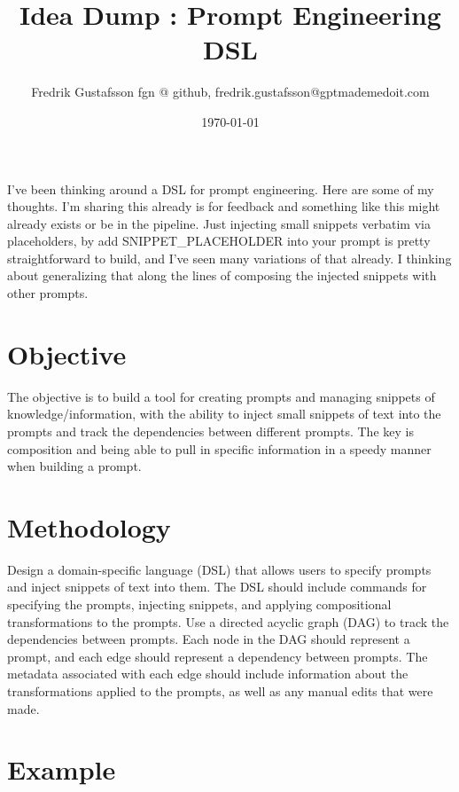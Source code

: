 \documentclass{article}
\begin{document}
\title{Idea Dump : Prompt Engineering DSL}
\author{Fredrik Gustafsson fgn @ github, fredrik.gustafsson@gptmademedoit.com}
\date{\today}

\maketitle

I've been thinking around a DSL for prompt engineering. Here are some of my thoughts. I'm sharing this already is for feedback and something like this might already exists or be in the pipeline. Just injecting small snippets verbatim via placeholders, by add SNIPPET\_PLACEHOLDER into your prompt is pretty straightforward to build, and I've seen many variations of that already. I thinking about generalizing that along the lines of composing the injected snippets with other prompts.

\section{Objective}

The objective is to build a tool for creating prompts and managing snippets of knowledge/information, with the ability to inject small snippets of text into the prompts and track the dependencies between different prompts. The key is composition and being able to pull in specific information in a speedy manner when building a prompt. 

\section{Methodology}

Design a domain-specific language (DSL) that allows users to specify prompts and inject snippets of text into them. The DSL should include commands for specifying the prompts, injecting snippets, and applying compositional transformations to the prompts. Use a directed acyclic graph (DAG) to track the dependencies between prompts. Each node in the DAG should represent a prompt, and each edge should represent a dependency between prompts. The metadata associated with each edge should include information about the transformations applied to the prompts, as well as any manual edits that were made.

\section{Example}
\end{document}
